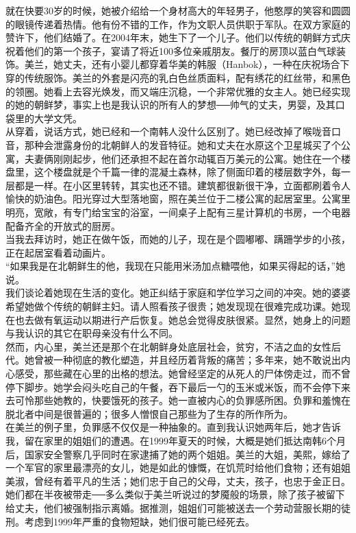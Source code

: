 就在快要30岁的时候，她被介绍给一个身材高大的年轻男子，他憨厚的笑容和圆圆的眼镜传递着热情。他有份不错的工作，作为文职人员供职于军队。在双方家庭的赞许下，他们结婚了。在2004年末，她生下了一个儿子。他们以传统的朝鲜方式庆祝着他们的第一个孩子，宴请了将近100多位亲戚朋友。餐厅的房顶以蓝白气球装饰。美兰，她丈夫，还有小婴儿都穿着华美的韩服（Hanbok），一种在庆祝场合下穿的传统服饰。美兰的外套是闪亮的乳白色丝质面料，配有绣花的红丝带，和黑色的领圈。她看上去容光焕发，而又端庄沉稳，一个非常优雅的女主人。她已经实现的她的朝鲜梦，事实上也是我认识的所有人的梦想──帅气的丈夫，男婴，及其口袋里的大学文凭。\\

从穿着，说话方式，她已经和一个南韩人没什么区别了。她已经改掉了喉咙音口音，那种会泄露身份的北朝鲜人的发音特征。她和丈夫在水原这个卫星城买了个公寓，夫妻俩刚刚起步，他们还承担不起在首尔动辄百万美元的公寓。她住在一个楼盘里，这个楼盘就是个千篇一律的混凝土森林，除了侧面印着的楼层数字外，每一层都是一样。在小区里转转，其实也还不错。建筑都很新很干净，立面都刷着令人愉快的奶油色。阳光穿过大型落地窗，照在美兰位于二楼公寓的起居室里。公寓里明亮，宽敞，有专门给宝宝的浴室，一间桌子上配有三星计算机的书房，一个电器配备齐全的开放式的厨房。\\

当我去拜访时，她正在做午饭，而她的儿子，现在是个圆嘟嘟、蹒跚学步的小孩，正在起居室看着动画片。\\

“如果我是在北朝鲜生的他，我现在只能用米汤加点糖喂他，如果买得起的话，”她说。\\

我们谈论着她现在生活的变化。她正纠结于家庭和学位学习之间的冲突。她的婆婆希望她做个传统的朝鲜主妇。请人照看孩子很贵；她发现现在很难完成功课。她现在也去做有氧运动以期进行产后恢复。她总会觉得皮肤很紧。显然，她身上的问题与我认识的其它在职母亲没有什么不同。\\

然而，内心里，美兰还是那个在北朝鲜身处底层社会，贫穷，不洁之血的女性后代。她曾被一种彻底的教化塑造，并且经历着背叛的痛苦；多年来，她不敢说出内心感受，那些藏在心里的出格的想法。她曾经坚定的从死人的尸体傍走过，而不曾停下脚步。她学会闷头吃自己的午餐，吞下最后一勺的玉米或米饭，而不会停下来去可怜那些她教的，快要饿死的孩子。她一直被内心的负罪感所困。负罪和羞愧在脱北者中间是很普遍的；很多人憎恨自己那些为了生存的所作所为。\\

在美兰的例子里，负罪感不仅仅是一种抽象的。直到我认识她两年后，她才告诉我，留在家里的姐姐们的遭遇。在1999年夏天的时候，大概是她们抵达南韩6个月后，国家安全警察几乎同时在家逮捕了她的两个姐姐。美兰的大姐，美熙，嫁给了一个军官的家里最漂亮的女儿，她是如此的慷慨，在饥荒时给他们食物；还有姐姐美淑，曾经有着平凡的生活；她们忠于自己的父母，丈夫，孩子，也忠于金正日。她们都在半夜被带走──多么类似于美兰听说过的梦魇般的场景，除了孩子被留下给丈夫，他们被强制指示离婚。据推测，姐姐们可能被送去一个劳动营服长期的徒刑。考虑到1999年严重的食物短缺，她们很可能已经死去。\\

